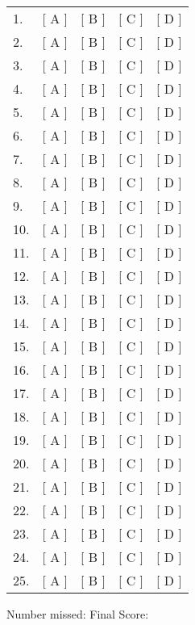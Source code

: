 \documentclass[10pt,a4paper]{exam}
\begin{document}
\else
\begin{tabular}{lcccc}\\
  1. & [ A ] & [ B ] & [ C ] & [ D ] \\
  2. & [ A ] & [ B ] & [ C ] & [ D ] \\
  3. & [ A ] & [ B ] & [ C ] & [ D ] \\
  4. & [ A ] & [ B ] & [ C ] & [ D ] \\
  5. & [ A ] & [ B ] & [ C ] & [ D ] \\
  6. & [ A ] & [ B ] & [ C ] & [ D ] \\
  7. & [ A ] & [ B ] & [ C ] & [ D ] \\
  8. & [ A ] & [ B ] & [ C ] & [ D ] \\
  9. & [ A ] & [ B ] & [ C ] & [ D ] \\
  10. & [ A ] & [ B ] & [ C ] & [ D ] \\
  11. & [ A ] & [ B ] & [ C ] & [ D ] \\
  12. & [ A ] & [ B ] & [ C ] & [ D ] \\
  13. & [ A ] & [ B ] & [ C ] & [ D ] \\
  14. & [ A ] & [ B ] & [ C ] & [ D ] \\
  15. & [ A ] & [ B ] & [ C ] & [ D ] \\
  16. & [ A ] & [ B ] & [ C ] & [ D ] \\
  17. & [ A ] & [ B ] & [ C ] & [ D ] \\
  18. & [ A ] & [ B ] & [ C ] & [ D ] \\
  19. & [ A ] & [ B ] & [ C ] & [ D ] \\
  20. & [ A ] & [ B ] & [ C ] & [ D ] \\
  21. & [ A ] & [ B ] & [ C ] & [ D ] \\
  22. & [ A ] & [ B ] & [ C ] & [ D ] \\
  23. & [ A ] & [ B ] & [ C ] & [ D ] \\
  24. & [ A ] & [ B ] & [ C ] & [ D ] \\
  25. & [ A ] & [ B ] & [ C ] & [ D ] \\
\end{tabular}

\fi

\vspace{.5in}

Number missed: \makebox[.5in]{\hrulefill} Final Score: \makebox[.5in]{\hrulefill}

\newpage


\pointsinmargin
\bracketedpoints
\end{document}

